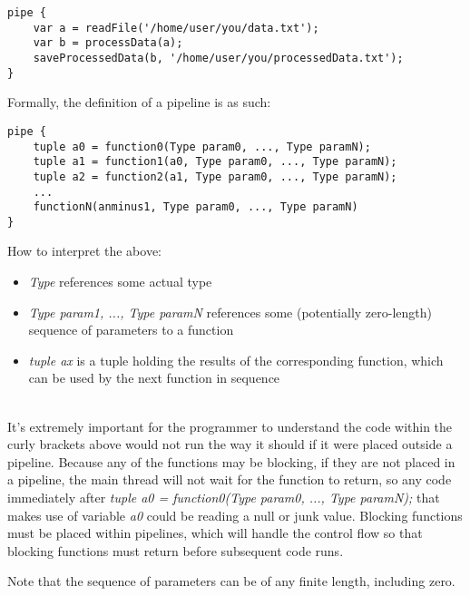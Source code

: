 \documentclass[./LRM_main.tex]{subfiles}
\begin{document}
\begin{lstlisting}
pipe {
	var a = readFile('/home/user/you/data.txt'); 
 	var b = processData(a); 
	saveProcessedData(b, '/home/user/you/processedData.txt');
}
\end{lstlisting}
Formally, the definition of a pipeline is as such:
\begin{lstlisting}
pipe {
	tuple a0 = function0(Type param0, ..., Type paramN); 
	tuple a1 = function1(a0, Type param0, ..., Type paramN); 
	tuple a2 = function2(a1, Type param0, ..., Type paramN);
	... 
	functionN(anminus1, Type param0, ..., Type paramN)
}
\end{lstlisting}
How to interpret the above:\\
\begin{itemize}
    \item \textit{Type} references some actual type\\
    \item \textit{Type param1, ..., Type paramN} references some (potentially zero-length) sequence of parameters to a function\\
    \item \textit{tuple ax} is a tuple holding the results of the corresponding function, which can be used by the next function in sequence\\\\
\end{itemize}
It's extremely important for the programmer to understand the code within the curly brackets above would not run the way it should if it were placed outside a pipeline. Because any of the functions
may be blocking, if they are not placed in a pipeline, the main thread will not wait for the function to return, so any code immediately after \textit{tuple a0 = function0(Type param0, ..., Type
paramN);} that makes use of variable \textit{a0} could be reading a null or junk value. Blocking functions must be placed within pipelines, which will handle the control flow so that blocking functions must return before subsequent code runs.
\begin{adjustwidth}{1cm}{2cm}
Note that the sequence of parameters can be of any finite length, including zero.
\end{adjustwidth}
\end{document}
